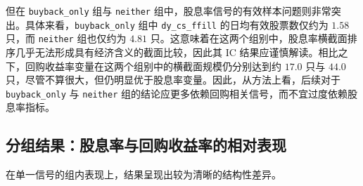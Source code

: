 \documentclass[a4paper,10pt]{article}
\begin{document}
但在 \texttt{buyback\_only} 组与 \texttt{neither} 组中，股息率信号的有效样本问题则非常突出。具体来看，\texttt{buyback\_only} 组中 \texttt{dy\_cs\_ffill} 的日均有效股票数仅约为 $1.58$ 只，而 \texttt{neither} 组也仅约为 $4.81$ 只。这意味着在这两个组别中，股息率横截面排序几乎无法形成具有经济含义的截面比较，因此其 IC 结果应谨慎解读。相比之下，回购收益率变量在这两个组别中的横截面规模仍分别达到约 $17.0$ 只与 $44.0$ 只，尽管不算很大，但仍明显优于股息率变量。因此，从方法上看，后续对于 \texttt{buyback\_only} 与 \texttt{neither} 组的结论应更多依赖回购相关信号，而不宜过度依赖股息率指标。

\subsection{分组结果：股息率与回购收益率的相对表现}

在单一信号的组内表现上，结果呈现出较为清晰的结构性差异。
\end{document}
